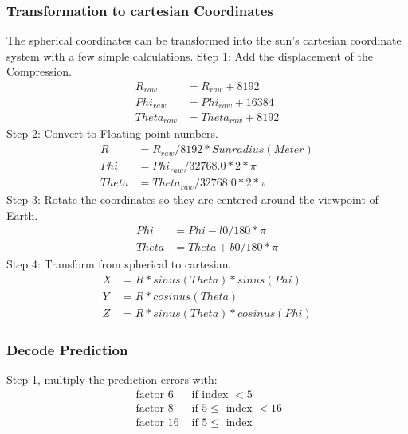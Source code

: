 \subsubsection*{Transformation to cartesian Coordinates} \label{anhang:format:euler}
The spherical coordinates can be transformed into the sun's cartesian coordinate system with a few simple calculations.
Step 1: Add the displacement of the Compression. 
\begin{equation}
\begin{split}
	R_{raw} &= R_{raw} + 8192\\
	Phi_{raw} &= Phi_{raw} + 16384\\
	Theta_{raw} &= Theta_{raw} + 8192
\end{split}
\end{equation}
Step 2: Convert to Floating point numbers.
\begin{equation}
\begin{split}
	R &= R_{raw} / 8192 * Sunradius (Meter)\\
	Phi &= Phi_{raw} / 32768.0 * 2 *\pi\\
	Theta &= Theta_{raw} /32768.0 * 2 *\pi
	\end{split}
\end{equation}
Step 3: Rotate the coordinates so they are centered around the viewpoint of Earth.
\begin{equation}
\begin{split}
	Phi &= Phi - l0 /180 * \pi\\
	Theta &= Theta + b0 /180 * \pi
	\end{split}
\end{equation}
Step 4: Transform from spherical to cartesian.
\begin{equation}
\begin{split}
	X &= R * sinus(Theta) * sinus(Phi)\\
	Y &= R * cosinus(Theta)\\
	Z &= R * sinus(Theta) * cosinus(Phi)
	\end{split}
\end{equation}

\subsubsection*{Decode Prediction}\label{anhang:format:prediction}
Step 1, multiply the prediction errors with:
\begin{equation}
\begin{split}
	\mbox{ factor }6 & \mbox{ if index } < 5\\
	\mbox{ factor }8 & \mbox{ if } 5 \leq \mbox{ index } < 16\\
	\mbox{ factor }16 & \mbox{ if } 5 \leq \mbox{ index }
\end{split}
\end{equation}

